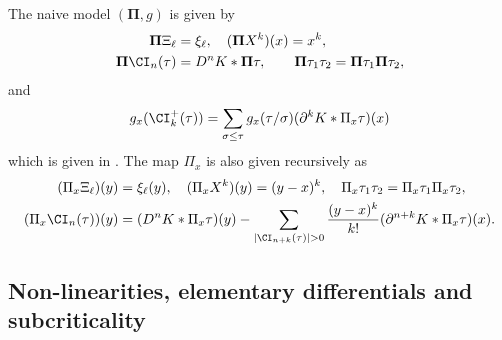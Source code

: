 \documentclass[11pt]{preprint}
\def\PPi{\boldsymbol{\Pi}}
\begin{document}
	The naive model $(\PPi, {g})$ is given by
	\begin{equation} \label{def_PPi_trees}
		\begin{aligned}
\PPi \Xi_{\ell} & = \xi_{\ell},	\quad  (\PPi X^k )(x) = x^{k}, \\	\PPi \CI_n(\tau) & = D^{n} K * \PPi \tau, \quad  \quad \PPi \tau_1 \tau_2 = \PPi \tau_1 \PPi \tau_2,
\end{aligned}
	\end{equation}
	and 
	\begin{equation} \label{def_g}
		\begin{aligned}
			g_x(\CI^+_k(\tau)) = \sum_{\sigma \leq \tau}  g_x(\tau / \sigma) (\partial^k K * \Pi_x \tau)(x)
		\end{aligned}
	\end{equation}
	which is given in \cite[Section 3.3]{BH26}. The map $\Pi_x$ is also given recursively as
	\begin{equation}
	\label{def_Pi_trees}
	\begin{aligned}
		(\Pi_x \Xi_{\ell})(y) & = \xi_{\ell}(y),	\quad  (\Pi_x X^k )(y) = (y-x)^{k}, \quad  \Pi_x \tau_1 \tau_2 = \Pi_x \tau_1 \Pi_x \tau_2, \\	(\Pi_x \CI_n(\tau))(y) & = (D^{n} K * \Pi_x \tau)(y) - \sum_{|\CI_{n+k}(\tau)| > 0}   \frac{(y-x)^{k}}{k!}(\partial^{n+k} K * \Pi_x \tau)(x). 
	\end{aligned}
	\end{equation}
	
	
	
	\subsection{Non-linearities, elementary differentials and subcriticality}
	
	\label{subsec_subcriticality}
	
\end{document}
